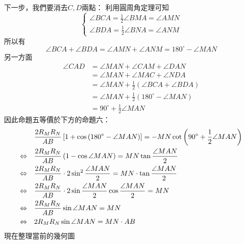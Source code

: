 下一步，我們要消去$C,D$兩點：
利用圓周角定理可知
$$
\begin{cases}
  \angle{BCA}=\frac{1}{2}\angle{BMA}=\angle{AMN}\\ 
  \angle{BDA}=\frac{1}{2}\angle{BNA}=\angle{ANM}
\end{cases}
$$
所以有
$$
\angle{BCA}+\angle{BDA}=\angle{AMN}+\angle{ANM}=180^{\circ}-\angle{MAN}
$$
另一方面
\begin{align*}
  \angle{CAD}&=\angle{MAN}+\angle{CAM}+\angle{DAN}\\
  &=\angle{MAN}+\angle{MAC}+\angle{NDA}\\
  &=\angle{MAN}+\frac{1}{2}\left(\angle{BCA}+\angle{BDA}\right)\\
  &=\angle{MAN}+\frac{1}{2}\left(180^{\circ}-\angle{MAN}\right)\\
  &=90^{\circ}+\frac{1}{2}\angle{MAN}
\end{align*}
因此命題五等價於下方的命題六：
\begin{align}
  &\frac{2R_MR_N}{AB}\left[1+\cos{\left(180^{\circ}-\angle{MAN}\right)}\right]
  =-MN\cot{\left(90^{\circ}+\frac{1}{2}\angle{MAN}\right)}\notag\\
  \Leftrightarrow\quad&\frac{2R_MR_N}{AB}\left(1-\cos{\angle{MAN}}\right)
  =MN\tan{\frac{\angle{MAN}}{2}}\notag\\
  \Leftrightarrow\quad&\frac{2R_MR_N}{AB}\cdot2\sin^2{\frac{\angle{MAN}}{2}}=MN\cdot\tan{\frac{\angle{MAN}}{2}}\notag\\
  \Leftrightarrow\quad&\frac{2R_MR_N}{AB}\cdot2\sin{\frac{\angle{MAN}}{2}}\cos{\frac{\angle{MAN}}{2}}=MN\notag\\
  \Leftrightarrow\quad&\frac{2R_MR_N}{AB}\sin{\angle{MAN}}=MN\notag\\
  \Leftrightarrow\quad&2R_MR_N\sin{\angle{MAN}}=MN\cdot AB
\end{align}
現在整理當前的幾何圖
\begin{center} %
\end{center}
